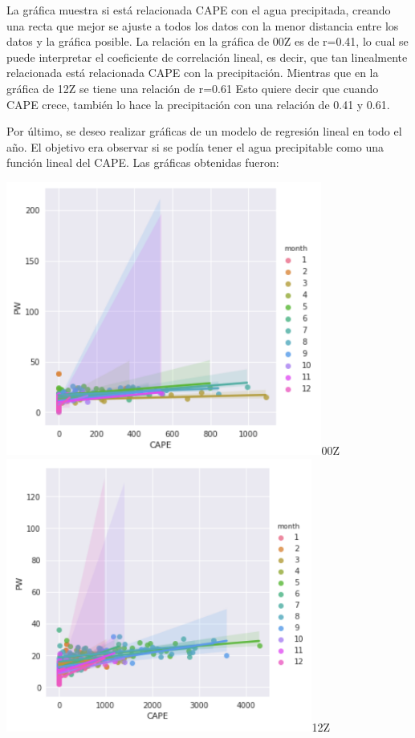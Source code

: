 \documentclass{article}
\begin{document}
La gráfica muestra si está relacionada CAPE con el agua precipitada, creando una recta que mejor se ajuste a todos los datos con la menor distancia entre los datos y la gráfica posible. La relación en la gráfica de 00Z es de  r=0.41, lo cual se puede interpretar el coeficiente de correlación lineal, es decir, que tan linealmente relacionada está relacionada CAPE con la precipitación. Mientras que en la gráfica de 12Z se tiene una relación de r=0.61 Esto quiere decir que cuando CAPE crece, también lo hace la precipitación con una relación de 0.41 y 0.61.

Por último, se deseo realizar gráficas de un modelo de regresión lineal en todo el año. El objetivo era observar si se podía tener el agua precipitable como una función lineal del CAPE. Las gráficas obtenidas fueron:

	\begin{center}
    \includegraphics[height=9cm]{regresion00.png}{00Z}
    \includegraphics[height=9cm]{regresion12.png}{12Z}
    \end{center}
\end{document}
